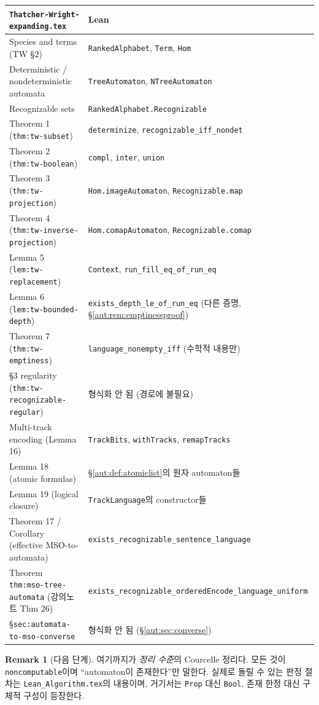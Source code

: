 \documentclass[11pt]{article}
\theoremstyle{definition}
\newtheorem{remark}[definition]{Remark}
\theoremstyle{plain}
\newcommand{\lean}[1]{\texttt{#1}}
\newcommand{\leanfile}[1]{\texttt{#1}}
\begin{document}
\begin{center}
\begin{tabular}{p{}p{}}
\hline
\leanfile{Thatcher-Wright-expanding.tex} & Lean \\
\hline
Species and terms (TW \S2) &
  \lean{RankedAlphabet}, \lean{Term}, \lean{Hom} \\
Deterministic / nondeterministic automata &
  \lean{TreeAutomaton}, \lean{NTreeAutomaton} \\
Recognizable sets &
  \lean{RankedAlphabet.Recognizable} \\
Theorem 1 (\lean{thm:tw-subset}) &
  \lean{determinize}, \lean{recognizable\_iff\_nondet} \\
Theorem 2 (\lean{thm:tw-boolean}) &
  \lean{compl}, \lean{inter}, \lean{union} \\
Theorem 3 (\lean{thm:tw-projection}) &
  \lean{Hom.imageAutomaton}, \lean{Recognizable.map} \\
Theorem 4 (\lean{thm:tw-inverse-projection}) &
  \lean{Hom.comapAutomaton}, \lean{Recognizable.comap} \\
Lemma 5 (\lean{lem:tw-replacement}) &
  \lean{Context}, \lean{run\_fill\_eq\_of\_run\_eq} \\
Lemma 6 (\lean{lem:tw-bounded-depth}) &
  \lean{exists\_depth\_le\_of\_run\_eq} (다른 증명, \S\ref{aut:rem:emptinessproof}) \\
Theorem 7 (\lean{thm:tw-emptiness}) &
  \lean{language\_nonempty\_iff} (수학적 내용만) \\
\S3 regularity (\lean{thm:tw-recognizable-regular}) &
  형식화 안 됨 (경로에 불필요) \\
Multi-track encoding (Lemma 16) &
  \lean{TrackBits}, \lean{withTracks}, \lean{remapTracks} \\
Lemma 18 (atomic formulas) &
  \S\ref{aut:def:atomiclist}의 원자 automaton들 \\
Lemma 19 (logical closure) &
  \lean{TrackLanguage}의 constructor들 \\
Theorem 17 / Corollary (effective MSO-to-automata) &
  \lean{exists\_recognizable\_sentence\_language} \\
Theorem \lean{thm:mso-tree-automata} (강의노트 Thm 26) &
  \lean{exists\_recognizable\_orderedEncode\_language\_uniform} \\
\S\lean{sec:automata-to-mso-converse} &
  형식화 안 됨 (\S\ref{aut:sec:converse}) \\
\hline
\end{tabular}
\end{center}

\begin{remark}[다음 단계]
여기까지가 \emph{정리 수준}의 Courcelle 정리다. 모든 것이
\lean{noncomputable}이며 ``automaton이 존재한다''만 말한다. 실제로 돌릴 수
있는 판정 절차는 \leanfile{Lean\_Algorithm.tex}의 내용이며, 거기서는
\lean{Prop} 대신 \lean{Bool}, 존재 한정 대신 구체적 구성이 등장한다.
\end{remark}
\end{document}
